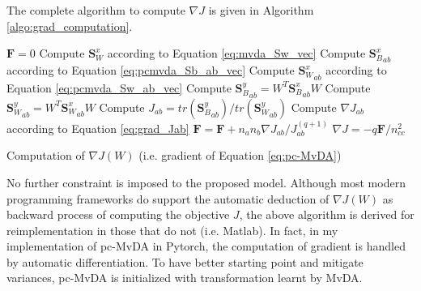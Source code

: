         The complete algorithm to compute $\nabla J$ is given in Algorithm \ref{algo:grad_computation}.

        \begin{algorithm}
            \SetEndCharOfAlgoLine{\relax}
            $\boldsymbol{F} = 0$\;
            Compute $\boldsymbol{S}_W^x$ according to Equation \eqref{eq:mvda_Sw_vec}\;
             {
                 {
                    Compute ${\boldsymbol{S}_B^x}_{ab}$ according to Equation \eqref{eq:pcmvda_Sb_ab_vec}\;
                    Compute ${\boldsymbol{S}_W^x}_{ab}$ according to Equation \eqref{eq:pcmvda_Sw_ab_vec}\;
                    Compute ${\boldsymbol{S}_B^y}_{ab}=W^T{\boldsymbol{S}_B^x}_{ab}W$\;
                    Compute ${\boldsymbol{S}_W^y}_{ab}=W^T{\boldsymbol{S}_W^x}_{ab}W$\;
                    Compute $J_{ab}=tr\left({\boldsymbol{S}_B^y}_{ab}\right)/tr\left({\boldsymbol{S}_W^y}_{ab}\right)$\;
                    Compute $\nabla J_{ab}$ according to Equation \eqref{eq:grad_Jab}\;
                    $\boldsymbol{F} = \boldsymbol{F} + n_an_b\nabla J_{ab}/J_{ab}^{(q+1)}$\;
                }
            }
            $\nabla J = {-q\boldsymbol{F}}/{n_{cc}^2}$\;
            \caption{Computation of $\nabla J\left(W\right)$ (i.e. gradient of Equation \eqref{eq:pc-MvDA})}
            \label{algo:grad_computation}
        \end{algorithm}

        No further constraint is imposed to the proposed model. Although most modern programming frameworks do support the automatic deduction of $\nabla J\left(W\right)$ as backward process of computing the objective $J$, the above algorithm is derived for reimplementation in those that do not (i.e. Matlab).
        In fact, in my implementation of pc-MvDA in Pytorch, the computation of gradient is handled by automatic differentiation.
        To have better starting point and mitigate variances, pc-MvDA is initialized with transformation learnt by MvDA.
